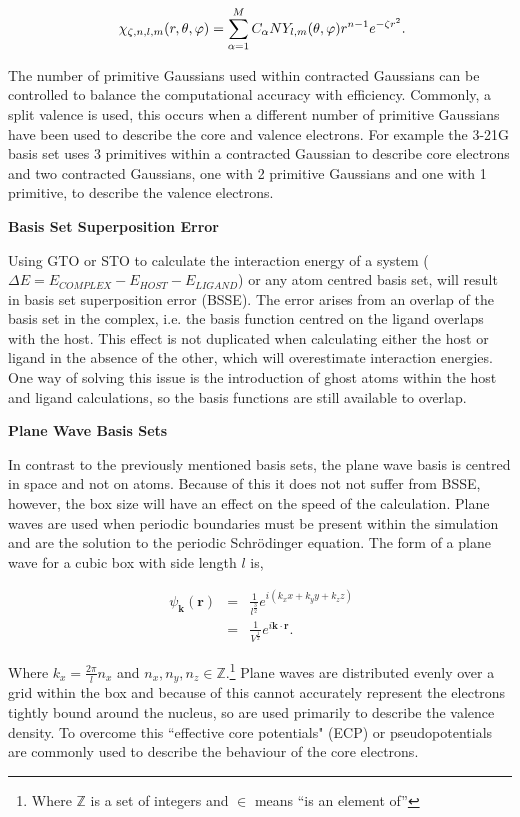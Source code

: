 \begin{equation}
\  \chi_{\zeta,n,l,m}(r, \theta, \varphi)=\sum_{\alpha=1}^{M} C_{\alpha} N Y_{l,m}(\theta, \varphi)r^{n-1}e^{-\zeta r^2} \\.
\end{equation}

The number of primitive Gaussians used within contracted Gaussians can be controlled to balance the computational accuracy with efficiency.  Commonly, a split valence is used, this occurs when a different number of primitive Gaussians have been used to describe the core and valence electrons.  For example the 3-21G basis set uses 3 primitives within a contracted Gaussian to describe core electrons and two contracted Gaussians, one with 2 primitive Gaussians and one with 1 primitive, to describe the valence electrons.

\textbf{Basis Set Superposition Error}

Using GTO or STO to calculate the interaction energy of a system ($\Delta E = E_{COMPLEX} - E_{HOST} - E_{LIGAND}$) or any atom centred basis set, will result in basis set superposition error (BSSE).  The error arises from an overlap of the basis set in the complex, i.e. the basis function centred on the ligand overlaps with the host.  This effect is not duplicated when calculating either the host or ligand in the absence of the other, which will overestimate interaction energies.  One way of solving this issue is the introduction of ghost atoms within the host and ligand calculations, so the basis functions are still available to overlap.

\textbf{Plane Wave Basis Sets}

In contrast to the previously mentioned basis sets, the plane wave basis is centred in space and not on atoms.  Because of this it does not not suffer from BSSE, however, the box size will have an effect on the speed of the calculation.  Plane waves are used when periodic boundaries must be present within the simulation and are the solution to the periodic Schr\"{o}dinger equation.  The form of a plane wave for a cubic box with side length $l$ is,

\begin{eqnarray}
\ \psi_{\mathbf{k}}(\mathbf{r}) &=& \frac{1}{l^{\frac{3}{2}}} e ^{i(k_x x+k_y y + k_z z)} \\
\ &=& \frac{1}{V^{\frac{1}{2}}} e^{i \mathbf{k}\cdot\mathbf{r}} .
\end{eqnarray}

Where $k_x =  \frac{2\pi}{l}n_x$ and $n_x, n_y, n_z \in \mathbb{Z}$.\footnote{Where $\mathbb{Z}$ is a set of integers and $\in$ means ``is an element of''}  Plane waves are distributed evenly over a grid within the box and because of this cannot accurately represent the electrons tightly bound around the nucleus, so are used primarily to describe the valence density.  To overcome this ``effective core potentials" (ECP) or pseudopotentials are commonly used to describe the behaviour of the core electrons.

